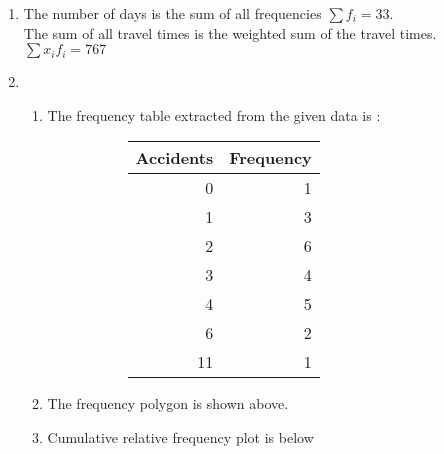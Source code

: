 \begin{enumerate}
	\item The number of days is the sum of all frequencies $ \sum f_i  = 33$. \\
	The sum of all travel times is the weighted sum of the travel times. $  \sum x_i f_i  = 767 $ \\
	
	\item \begin{enumerate}
		\item The frequency table extracted from the given data is :
		\begin{figure}[H]
			\begin{subfigure}[]{0.45\linewidth}
				\centering
				\begin{table}[H]
					
					\begin{tabular}{@{}rr@{}}
						\toprule
						Accidents & Frequency \\ \midrule
						0         & 1         \\
						1         & 3         \\
						2         & 6         \\
						3         & 4         \\
						4         & 5         \\
						6         & 2         \\
						11        & 1         \\ \bottomrule
					\end{tabular}
				\end{table}
			\end{subfigure}
			\begin{subfigure}[]{0.45\linewidth}
				\centering
			\end{subfigure}
			
		\end{figure}
		
		\item The frequency polygon is shown above. \\
		
		\item Cumulative relative frequency plot is below \\
		

\end{enumerate}
\end{enumerate}
